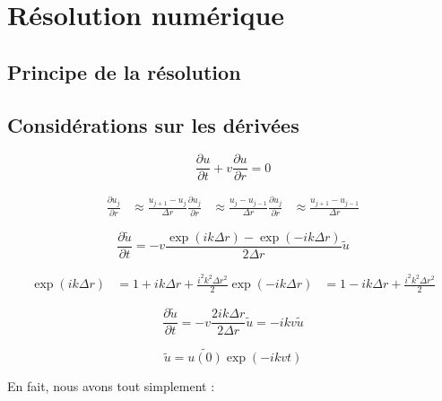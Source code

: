 \section{Résolution numérique}

\subsection{Principe de la résolution}

%

\subsection{Considérations sur les dérivées}

\begin{equation}
    \frac{\partial u}{\partial t} + v \frac{\partial u}{\partial r} = 0
\end{equation}

\begin{align}
    \frac{\partial u_j}{\partial r} &\approx \frac{u_{j+1} - u_j}{\Delta{r}}
    \frac{\partial u_j}{\partial r} &\approx \frac{u_j - u_{j-1}}{\Delta{r}}
    \frac{\partial u_j}{\partial r} &\approx \frac{u_{j+1} - u_{j-1}}{\Delta{r}}
\end{align}

\begin{equation}
    \frac{\partial \tilde{u}}{\partial t} = - v \frac{\exp(ik\Delta{r}) - \exp(-ik\Delta{r})}{2 \Delta{r}} \tilde{u}
\end{equation}

\begin{align}
    \exp(ik\Delta{r}) &= 1 + ik\Delta{r} + \frac{i^2 k^2 \Delta{r}^2}{2}
    \exp(-ik\Delta{r}) &= 1 - ik\Delta{r} + \frac{i^2 k^2 \Delta{r}^2}{2}
\end{align}

\begin{equation}
    \frac{\partial \tilde{u}}{\partial t} = - v \frac{2ik\Delta{r}}{2\Delta{r}} \tilde{u} = - i k v \tilde{u}
\end{equation}

\begin{equation}
    \tilde{u} = \tilde{u(0)} \exp(-i k v t)
\end{equation}

En fait, nous avons tout simplement :


